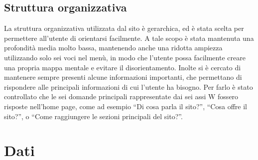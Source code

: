 \documentclass[10pt,a4paper,onecolumn]{article}
\begin{document}
\subsection{Struttura organizzativa}

La struttura organizzativa utilizzata dal sito è gerarchica, ed è stata scelta per permettere all'utente di orientarsi facilmente. A tale scopo è stata mantenuta una profondità media molto bassa, mantenendo anche una ridotta ampiezza utilizzando solo sei voci nel menù, in modo che l'utente possa facilmente creare una propria mappa mentale e evitare il disorientamento.
Inolte si è cercato di mantenere sempre presenti alcune informazioni importanti, che permettano di rispondere alle principali informazioni di cui l'utente ha bisogno. Per farlo è stato controllato che le sei domande principali rappresentate dai sei assi W fossero risposte nell'home page, come ad esempio ``Di cosa parla il sito?'', ``Cosa offre il sito?'', o ``Come raggiungere le sezioni principali del sito?''.

\section{Dati}
\end{document}
